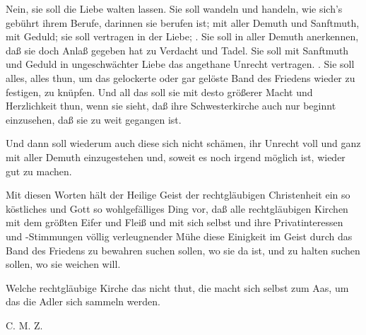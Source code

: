 Nein, sie soll die Liebe walten lassen. Sie soll wandeln und handeln, wie sich’s gebührt ihrem Berufe, darinnen sie berufen ist; mit aller Demuth und Sanftmuth, mit Geduld; sie soll vertragen in der Liebe; . Sie soll in aller Demuth anerkennen, daß sie doch Anlaß gegeben hat zu Verdacht und Tadel. Sie soll mit Sanftmuth und Geduld in ungeschwächter Liebe das angethane Unrecht vertragen. . Sie soll alles, alles thun, um das gelockerte oder gar gelöste Band des Friedens wieder zu festigen, zu knüpfen. Und all das soll sie mit desto größerer Macht und Herzlichkeit thun, wenn sie sieht, daß ihre Schwesterkirche auch nur beginnt einzusehen, daß sie zu weit gegangen ist.

Und dann soll wiederum auch diese sich nicht schämen, ihr Unrecht voll und ganz mit aller Demuth einzugestehen und, soweit es noch irgend möglich ist, wieder gut zu machen.

 Mit diesen Worten hält der Heilige Geist der rechtgläubigen Christenheit ein so köstliches und Gott so wohlgefälliges Ding vor, daß alle rechtgläubigen Kirchen mit dem größten Eifer und Fleiß und mit sich selbst und ihre Privatinteressen und -Stimmungen völlig verleugnender Mühe diese Einigkeit im Geist durch das Band des Friedens zu bewahren suchen sollen, wo sie da ist, und zu halten suchen sollen, wo sie weichen will.

Welche rechtgläubige Kirche das nicht thut, die macht sich selbst zum Aas, um das die Adler sich sammeln werden.

C. M. Z.\par
